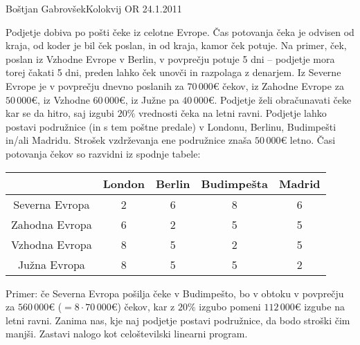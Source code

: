 \begin{naloga}{Boštjan Gabrovšek}{Kolokvij OR 24.1.2011}
\begin{vprasanje}
Podjetje dobiva po pošti čeke iz celotne Evrope.
Čas potovanja čeka je odvisen od kraja, od koder je bil ček poslan,
in od kraja, kamor ček potuje.
Na primer, ček, poslan iz Vzhodne Evrope v Berlin, v povprečju potuje 5 dni
-- podjetje mora torej čakati 5 dni,
preden lahko ček unovči in razpolaga z denarjem.
Iz Severne Evrope je v povprečju dnevno poslanih za $70\,000 €$ čekov,
iz Zahodne Evrope za $50\,000 €$, iz Vzhodne $60\,000 €$,
iz Južne pa $40\,000 €$.
Podjetje želi obračunavati čeke kar se da hitro,
saj izgubi $20\%$ vrednosti čeka na letni ravni.
Podjetje lahko postavi podružnice (in s tem poštne predale)
v Londonu, Berlinu, Budimpešti in/ali Madridu.
Strošek vzdrževanja ene podružnice znaša $50\,000 €$ letno.
Časi potovanja čekov so razvidni iz spodnje tabele:
\begin{center}
\begin{tabular}{c|cccc}
& London & Berlin & Budimpešta & Madrid \\ \hline
Severna Evropa & 2 & 6 & 8 & 6 \\
Zahodna Evropa & 6 & 2 & 5 & 5 \\
Vzhodna Evropa & 8 & 5 & 2 & 5 \\
Južna Evropa   & 8 & 5 & 5 & 2
\end{tabular}
\end{center}
Primer: če Severna Evropa pošilja čeke v Budimpešto,
bo v obtoku v pov\-preč\-ju za $560\,000 €$ ($= 8 \cdot 70\,000 €$) čekov,
kar z $20\%$ izgubo pomeni $112\,000 €$ izgube na letni ravni.
Zanima nas, kje naj podjetje postavi podružnice, da bodo stroški čim manjši.
Zastavi nalogo kot celoštevilski linearni program.
\end{vprasanje}
\begin{odgovor}
\end{odgovor}
\end{naloga}
